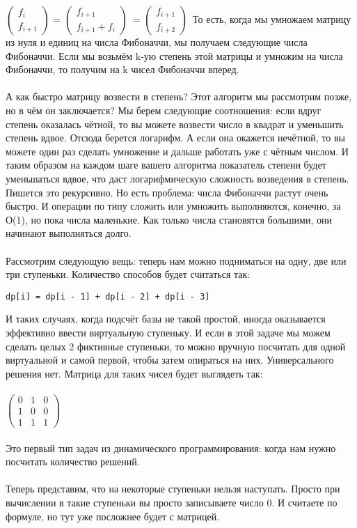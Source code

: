 \documentclass[a4paper,12pt]{article}
\begin{document}
 $\begin{pmatrix}
  f_i\\ 
  f_{i+1}
\end{pmatrix}$
=
 $\begin{pmatrix}
  f_{i+1}\\
  f_{i+1} + f_i
\end{pmatrix}$\
=
 $\begin{pmatrix}
  f_{i+1}\\
  f_{i+2}
\end{pmatrix}$\
То есть, когда мы умножаем матрицу из нуля и единиц на числа Фибоначчи, мы получаем следующие числа Фибоначчи. Если мы возьмём k-ую степень этой матрицы и умножим на числа Фибоначчи, то получим на k чисел Фибоначчи вперед. \\ \\А как быстро матрицу возвести в степень? Этот алгоритм мы рассмотрим позже, но в чём он заключается? Мы берем следующие соотношения: если вдруг степень оказалась чётной, то вы можете возвести число в квадрат и уменьшить степень вдвое. Отсюда берется логарифм. А если она окажется нечётной, то вы можете один раз сделать умножение и дальше работать уже с чётным числом. И таким образом на каждом шаге вашего алгоритма показатель степени будет уменьшаться вдвое, что даст логарифмическую сложность возведения в степень. Пишется это рекурсивно. Но есть проблема: числа Фибоначчи растут очень быстро. И операции по типу сложить или умножить выполняются, конечно, за О(1), но пока числа маленькие. Как только числа становятся большими, они начинают выполняться долго. \\ \\
Рассмотрим следующую вещь: теперь нам можно подниматься на одну, две или три ступеньки. Количество способов будет считаться так:
\begin{verbatim}
dp[i] = dp[i - 1] + dp[i - 2] + dp[i - 3]
\end{verbatim}
И таких случаях, когда подсчёт базы не такой простой, иногда оказывается эффективно ввести виртуальную ступеньку. И если в этой задаче мы можем сделать целых 2 фиктивные ступеньки, то можно вручную посчитать для одной виртуальной и самой первой, чтобы затем опираться на них. Универсального решения нет. Матрица для таких чисел будет выглядеть так:\\ \\
 $\begin{pmatrix}
  0 & 1 & 0\\
  1 & 0 & 0\\
  1 & 1 & 1
\end{pmatrix}$\\ \\ 
Это первый тип задач из динамического программирования: когда нам нужно посчитать количество решений. \\
\\
Теперь представим, что на некоторые ступеньки нельзя наступать. Просто при вычислении в такие ступеньки вы просто записываете число 0. И считаете по формуле, но тут уже посложнее будет с матрицей. 
\end{document}
